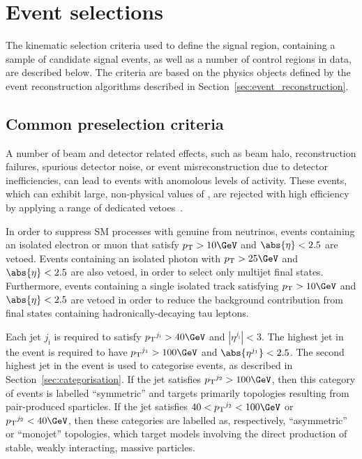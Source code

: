 \section{Event selections}
\label{sec:event_selection}

The kinematic selection criteria used to define the signal region,
containing a sample of candidate signal events, as well as a number of
control regions in data, are described below. The criteria are based
on the physics objects defined by the event reconstruction algorithms
described in Section~\ref{sec:event_reconstruction}.

\subsection{Common preselection criteria}
\label{sec:preselection}

A number of beam and detector related effects, such as beam halo,
reconstruction failures, spurious detector noise, or event
misreconstruction due to detector inefficiencies, can lead to events
with anomolous levels of activity. These events, which can exhibit
large, non-physical values of \ETmiss, are rejected with high
efficiency by applying a range of dedicated
vetoes~\cite{1748-0221-5-03-T03014, CMS-NOTE-2010-012, cms-met}.

In order to suppress SM processes with genuine \ETmiss from neutrinos,
events containing an isolated electron or muon that satisfy $\Pt >
10\GeV$ and $\abs{\eta} < 2.5$ are vetoed. Events containing an
isolated photon with $\Pt > 25\GeV$ and $\abs{\eta} < 2.5$ are also
vetoed, in order to select only multijet final states. Furthermore,
events containing a single isolated track satisfying $\Pt > 10\GeV$
and $\abs{\eta} < 2.5$ are vetoed in order to reduce the background
contribution from final states containing hadronically-decaying tau
leptons.

Each jet $j_\text{i}$ is required to satisfy $\Pt^{j_\text{i}} >
40\GeV$ and $|\eta^{j_\text{i}}| < 3$. The highest \Pt jet in the
event is required to have $\Pt^{j_\text{1}} > 100\GeV$ and
$\abs{\eta^{j_\text{1}}} < 2.5$. The second highest \Pt jet in the
event is used to categorise events, as described in
Section~\ref{sec:categorisation}. If the jet satisfies
$\Pt^{j_\text{2}} > 100\GeV$, then this category of events is labelled
``symmetric'' and targets primarily topologies resulting from
pair-produced sparticles. If the jet satisfies $40 < \Pt^{j_\text{2}}
< 100\GeV$ or $\Pt^{j_\text{2}} < 40\GeV$, then these categories are
labelled as, respectively, ``asymmetric'' or ``monojet'' topologies,
which target models involving the direct production of stable, weakly
interacting, massive particles.

